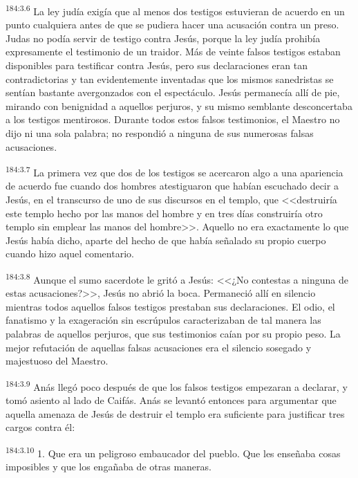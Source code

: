 \par 
\textsuperscript{184:3.6} La ley judía exigía que al menos dos testigos estuvieran de acuerdo en un punto cualquiera antes de que se pudiera hacer una acusación contra un preso. Judas no podía servir de testigo contra Jesús, porque la ley judía prohibía expresamente el testimonio de un traidor. Más de veinte falsos testigos estaban disponibles para testificar contra Jesús, pero sus declaraciones eran tan contradictorias y tan evidentemente inventadas que los mismos sanedristas se sentían bastante avergonzados con el espectáculo. Jesús permanecía allí de pie, mirando con benignidad a aquellos perjuros, y su mismo semblante desconcertaba a los testigos mentirosos. Durante todos estos falsos testimonios, el Maestro no dijo ni una sola palabra; no respondió a ninguna de sus numerosas falsas acusaciones.

\par 
\textsuperscript{184:3.7} La primera vez que dos de los testigos se acercaron algo a una apariencia de acuerdo fue cuando dos hombres atestiguaron que habían escuchado decir a Jesús, en el transcurso de uno de sus discursos en el templo, que <<destruiría este templo hecho por las manos del hombre y en tres días construiría otro templo sin emplear las manos del hombre>>. Aquello no era exactamente lo que Jesús había dicho, aparte del hecho de que había señalado su propio cuerpo cuando hizo aquel comentario.

\par 
\textsuperscript{184:3.8} Aunque el sumo sacerdote le gritó a Jesús: <<¿No contestas a ninguna de estas acusaciones?>>, Jesús no abrió la boca. Permaneció allí en silencio mientras todos aquellos falsos testigos prestaban sus declaraciones. El odio, el fanatismo y la exageración sin escrúpulos caracterizaban de tal manera las palabras de aquellos perjuros, que sus testimonios caían por su propio peso. La mejor refutación de aquellas falsas acusaciones era el silencio sosegado y majestuoso del Maestro.

\par 
\textsuperscript{184:3.9} Anás llegó poco después de que los falsos testigos empezaran a declarar, y tomó asiento al lado de Caifás. Anás se levantó entonces para argumentar que aquella amenaza de Jesús de destruir el templo era suficiente para justificar tres cargos contra él:

\par 
\textsuperscript{184:3.10} 1. Que era un peligroso embaucador del pueblo. Que les enseñaba cosas imposibles y que los engañaba de otras maneras.

